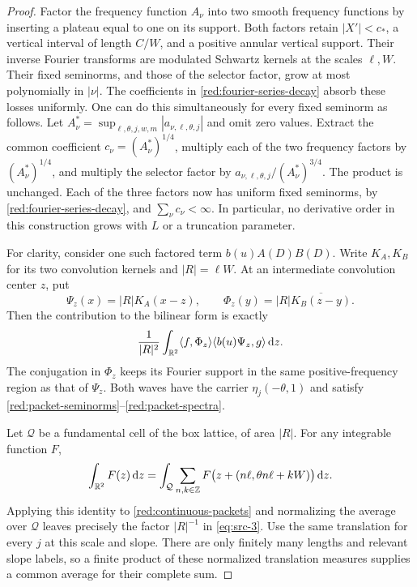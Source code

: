 \begin{proof}
Factor the frequency function \(A_\nu\) into two smooth frequency
functions by inserting a plateau equal to one on its support.
Both factors retain \(|X'|<c_*\), a vertical interval of length
\(C/W\), and a positive annular vertical support. Their inverse
Fourier transforms are modulated Schwartz kernels at the scales
\(\ell,W\). Their fixed seminorms, and those of the selector
factor, grow at most polynomially in \(|\nu|\). The coefficients
in \eqref{red:fourier-series-decay} absorb these losses uniformly.
One can do this simultaneously for every fixed seminorm as follows.
Let
\(A_\nu^*=\sup_{\ell,\theta,j,w,m}|a_{\nu,\ell,\theta,j}|\)
and omit zero values. Extract the common coefficient
\(c_\nu=(A_\nu^*)^{1/4}\), multiply each of the two frequency
factors by \((A_\nu^*)^{1/4}\), and multiply the selector factor
by \(a_{\nu,\ell,\theta,j}/(A_\nu^*)^{3/4}\).
The product is unchanged. Each of the three factors now has uniform
fixed seminorms, by \eqref{red:fourier-series-decay}, and
\(\sum_\nu c_\nu<\infty\). In particular, no derivative order
in this construction grows with \(L\) or a truncation parameter.

For clarity, consider one such factored term
\(b(u)A(D)B(D)\). Write \(K_A,K_B\) for its two convolution
kernels and \(|R|=\ell W\). At an intermediate convolution
center \(z\), put
\[
 \Psi_z(x)=|R|K_A(x-z),\qquad
 \Phi_z(y)=|R|\overline{K_B(z-y)}.
\]
Then the contribution to the bilinear form is exactly
\begin{equation}\label{red:continuous-packets}
 \frac1{|R|^2}\int_{\mathbb R^2}
       \langle f,\Phi_z\rangle
       \langle b(u)\Psi_z,g\rangle\,\mathrm d z.
\end{equation}
The conjugation in \(\Phi_z\) keeps its Fourier support in the
same positive-frequency region as that of \(\Psi_z\).
Both waves have the carrier \(\eta_j(-\theta,1)\) and satisfy
\eqref{red:packet-seminorms}--\eqref{red:packet-spectra}.

Let \(\mathcal Q\) be a fundamental cell of the box lattice,
of area \(|R|\). For any integrable function \(F\),
\[
 \int_{\mathbb R^2}F(z)\,\mathrm d z
    =\int_{\mathcal Q}\sum_{n,k\in\mathbb Z}
       F\bigl(z+(n\ell,\theta n\ell+kW)\bigr)\,\mathrm d z.
\]
Applying this identity to \eqref{red:continuous-packets} and
normalizing the average over \(\mathcal Q\) leaves precisely
the factor \(|R|^{-1}\) in \eqref{eq:src-3}. Use the same
translation for every \(j\) at this scale and slope. There are
only finitely many lengths and relevant slope labels, so a finite
product of these normalized translation measures supplies a common
average for their complete sum.


\end{proof}
